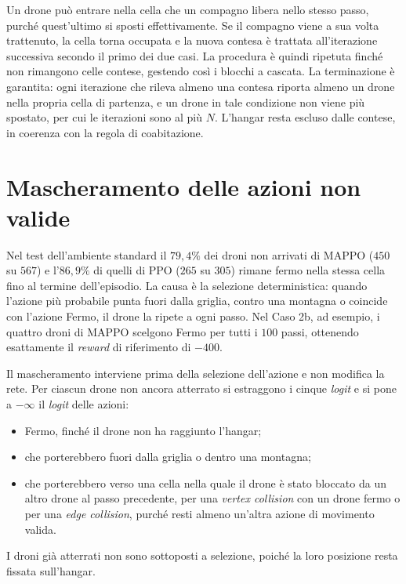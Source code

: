\documentclass[12pt,a4paper,twoside]{report}
\begin{document}
Un drone può entrare nella cella che un compagno libera nello stesso passo, purché quest'ultimo si sposti effettivamente. Se il compagno viene a sua volta trattenuto, la cella torna occupata e la nuova contesa è trattata all'iterazione successiva secondo il primo dei due casi. La procedura è quindi ripetuta finché non rimangono celle contese, gestendo così i blocchi a cascata. La terminazione è garantita: ogni iterazione che rileva almeno una contesa riporta almeno un drone nella propria cella di partenza, e un drone in tale condizione non viene più spostato, per cui le iterazioni sono al più $N$. L'hangar resta escluso dalle contese, in coerenza con la regola di coabitazione.

\section{Mascheramento delle azioni non valide}
\label{sec:mascheramento}

Nel test dell'ambiente standard il $79,4\%$ dei droni non arrivati di MAPPO ($450$ su $567$) e l'$86,9\%$ di quelli di PPO ($265$ su $305$) rimane fermo nella stessa cella fino al termine dell'episodio. La causa è la selezione deterministica: quando l'azione più probabile punta fuori dalla griglia, contro una montagna o coincide con l'azione Fermo, il drone la ripete a ogni passo. Nel Caso 2b, ad esempio, i quattro droni di MAPPO scelgono Fermo per tutti i $100$ passi, ottenendo esattamente il \emph{reward} di riferimento di $-400$.

Il mascheramento interviene prima della selezione dell'azione e non modifica la rete. Per ciascun drone non ancora atterrato si estraggono i cinque \emph{logit} e si pone a $-\infty$ il \emph{logit} delle azioni:
\begin{itemize}
    \item Fermo, finché il drone non ha raggiunto l'hangar;
    \item che porterebbero fuori dalla griglia o dentro una montagna;
    \item che porterebbero verso una cella nella quale il drone è stato bloccato da un altro drone al passo precedente, per una \emph{vertex collision} con un drone fermo o per una \emph{edge collision}, purché resti almeno un'altra azione di movimento valida.
\end{itemize}
I droni già atterrati non sono sottoposti a selezione, poiché la loro posizione resta fissata sull'hangar.
\end{document}
